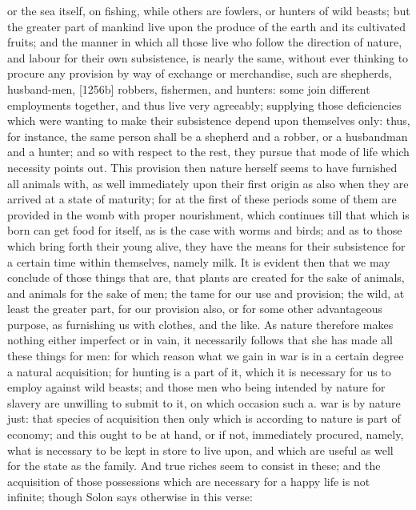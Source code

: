 or the sea itself, on fishing, while others are fowlers, or hunters of
wild beasts; but the greater part of mankind live upon the produce of the
earth and its cultivated fruits; and the manner in which all those live
who follow the direction of nature, and labour for their own subsistence,
is nearly the same, without ever thinking to procure any provision by way
of exchange or merchandise, such are shepherds, husband-men, [1256b]
robbers, fishermen, and hunters: some join different employments together,
and thus live very agreeably; supplying those deficiencies which were
wanting to make their subsistence depend upon themselves only: thus, for
instance, the same person shall be a shepherd and a robber, or a
husbandman and a hunter; and so with respect to the rest, they pursue that
mode of life which necessity points out. This provision then nature
herself seems to have furnished all animals with, as well immediately upon
their first origin as also when they are arrived at a state of maturity;
for at the first of these periods some of them are provided in the womb
with proper nourishment, which continues till that which is born can get
food for itself, as is the case with worms and birds; and as to those
which bring forth their young alive, they have the means for their
subsistence for a certain time within themselves, namely milk. It is
evident then that we may conclude of those things that are, that plants
are created for the sake of animals, and animals for the sake of men; the
tame for our use and provision; the wild, at least the greater part, for
our provision also, or for some other advantageous purpose, as furnishing
us with clothes, and the like. As nature therefore makes nothing either
imperfect or in vain, it necessarily follows that she has made all these
things for men: for which reason what we gain in war is in a certain
degree a natural acquisition; for hunting is a part of it, which it is
necessary for us to employ against wild beasts; and those men who being
intended by nature for slavery are unwilling to submit to it, on which
occasion such a. war is by nature just: that species of acquisition then
only which is according to nature is part of economy; and this ought to be
at hand, or if not, immediately procured, namely, what is necessary to be
kept in store to live upon, and which are useful as well for the state as
the family. And true riches seem to consist in these; and the acquisition
of those possessions which are necessary for a happy life is not infinite;
though Solon says otherwise in this verse:

